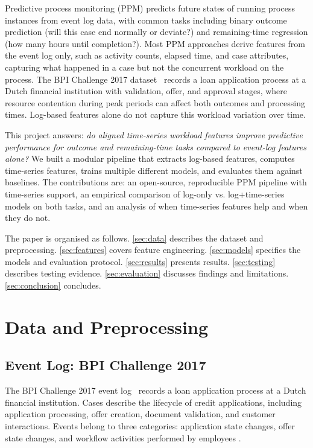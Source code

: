 \documentclass[runningheads]{llncs}
\begin{document}
Predictive process monitoring (PPM) predicts future states of running process
instances from event log data, with common tasks including binary
outcome prediction (will this case end normally or deviate?) and remaining-time
regression (how many hours until completion?). Most PPM approaches derive
features from the event log only, such as activity counts, elapsed time, and case
attributes, capturing what happened in a case but not the
concurrent workload on the process. The BPI Challenge 2017
dataset~\cite{bpic2017} records a loan application process at a Dutch
financial institution with validation, offer, and approval stages, where
resource contention during peak periods can affect both
outcomes and processing times. Log-based features alone do not capture
this workload variation over time.

This project answers: \emph{do aligned time-series workload features
improve predictive performance for outcome and remaining-time tasks compared
to event-log features alone?} We built a modular pipeline that extracts
log-based features, computes time-series features, trains multiple different models,
and evaluates them against baselines. The contributions are: an open-source, reproducible PPM
pipeline with time-series support, an empirical comparison of log-only vs.
log+time-series models on both tasks, and an analysis of when time-series
features help and when they do not.

The paper is organised as follows. \autoref{sec:data} describes the dataset and
preprocessing. \autoref{sec:features} covers feature engineering.
\autoref{sec:models} specifies the models and evaluation protocol.
\autoref{sec:results} presents results. \autoref{sec:testing} describes testing
evidence. \autoref{sec:evaluation} discusses findings and limitations.
\autoref{sec:conclusion} concludes.

\section{Data and Preprocessing}
\label{sec:data}

\subsection{Event Log: BPI Challenge 2017}
\label{sec:bpic2017}
The BPI Challenge 2017 event log~\cite{bpic2017} records a loan application
process at a Dutch financial institution. Cases describe the lifecycle of
credit applications, including application processing, offer creation,
document validation, and customer interactions. Events belong to three
categories: application state changes, offer state changes, and workflow
activities performed by employees \cite{povalyaeva2017bpic}.
\end{document}
